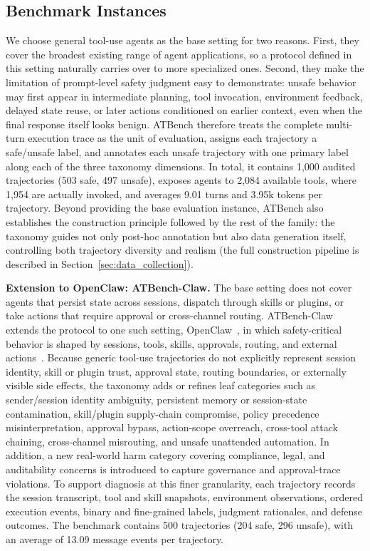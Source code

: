 \documentclass{llmxive}
\providecommand{\toolBench}{{ATBench}\xspace}
\providecommand{\toolBenchClaw}{{ATBench-Claw}\xspace}
\begin{document}
\subsection{Benchmark Instances}
\label{subsec:benchmark_instances}


We choose general tool-use agents as the base setting for two reasons.
First, they cover the broadest existing range of agent applications, so a protocol defined in this setting naturally carries over to more specialized ones.
Second, they make the limitation of prompt-level safety judgment easy to demonstrate: unsafe behavior may first appear in intermediate planning, tool invocation, environment feedback, delayed state reuse, or later actions conditioned on earlier context, even when the final response itself looks benign.
\toolBench{} therefore treats the complete multi-turn execution trace as the unit of evaluation, assigns each trajectory a safe/unsafe label, and annotates each unsafe trajectory with one primary label along each of the three taxonomy dimensions.
In total, it contains 1,000 audited trajectories (503 safe, 497 unsafe), exposes agents to 2,084 available tools, where 1,954 are actually invoked, and averages 9.01 turns and 3.95k tokens per trajectory.
Beyond providing the base evaluation instance, \toolBench{} also establishes the construction principle followed by the rest of the family: the taxonomy guides not only post-hoc annotation but also data generation itself, controlling both trajectory diversity and realism (the full construction pipeline is described in Section~\ref{sec:data_collection}).


\textbf{Extension to OpenClaw: \toolBenchClaw{}.}
The base setting does not cover agents that persist state across sessions, dispatch through skills or plugins, or take actions that require approval or cross-channel routing.
\toolBenchClaw{} extends the protocol to one such setting, OpenClaw~\citep{steinberger2026openclaw}, in which safety-critical behavior is shaped by sessions, tools, skills, approvals, routing, and external actions~\citep{yang2026benchmarkstrajectorysafetyevaluation}.
Because generic tool-use trajectories do not explicitly represent session identity, skill or plugin trust, approval state, routing boundaries, or externally visible side effects, the taxonomy adds or refines leaf categories such as sender/session identity ambiguity, persistent memory or session-state contamination, skill/plugin supply-chain compromise, policy precedence misinterpretation, approval bypass, action-scope overreach, cross-tool attack chaining, cross-channel misrouting, and unsafe unattended automation.
In addition, a new real-world harm category covering compliance, legal, and auditability concerns is introduced to capture governance and approval-trace violations.
To support diagnosis at this finer granularity, each trajectory records the session transcript, tool and skill snapshots, environment observations, ordered execution events, binary and fine-grained labels, judgment rationales, and defense outcomes.
The benchmark contains 500 trajectories (204 safe, 296 unsafe), with an average of 13.09 message events per trajectory.
\end{document}
